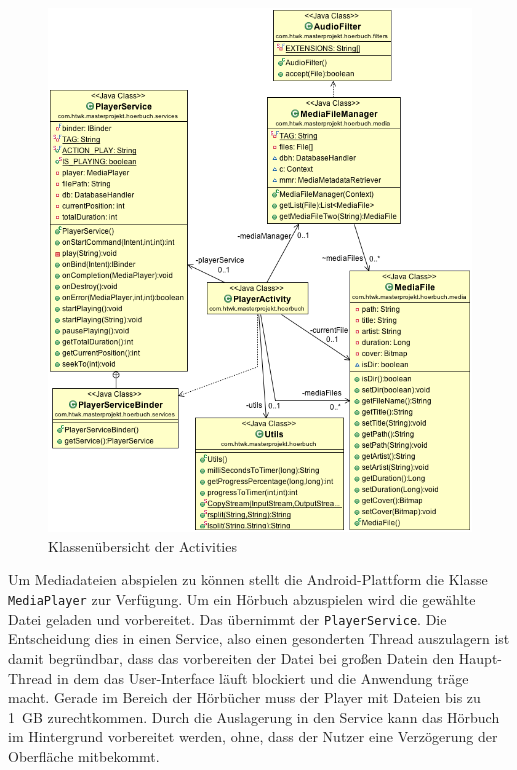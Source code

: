 \begin{figure}[ht!]
\begin{center}
\includegraphics[scale=.5]{images/cd_media}
\caption{Klassenübersicht der Activities}
\label{cd_media}
\end{center}
\end{figure}

Um Mediadateien abspielen zu können stellt die Android-Plattform die Klasse \verb+MediaPlayer+ zur Verfügung. Um ein Hörbuch abzuspielen wird die gewählte Datei geladen und vorbereitet. Das übernimmt der \verb+PlayerService+. Die Entscheidung dies in einen Service, also einen gesonderten Thread auszulagern ist damit begründbar, dass das vorbereiten der Datei bei großen Datein den Haupt-Thread in dem das User-Interface läuft blockiert und die Anwendung träge macht. Gerade im Bereich der Hörbücher muss der Player mit Dateien bis zu \SI{1}{GB} zurechtkommen. Durch die Auslagerung in den Service kann das Hörbuch im Hintergrund vorbereitet werden, ohne, dass der Nutzer eine Verzögerung der Oberfläche mitbekommt.

